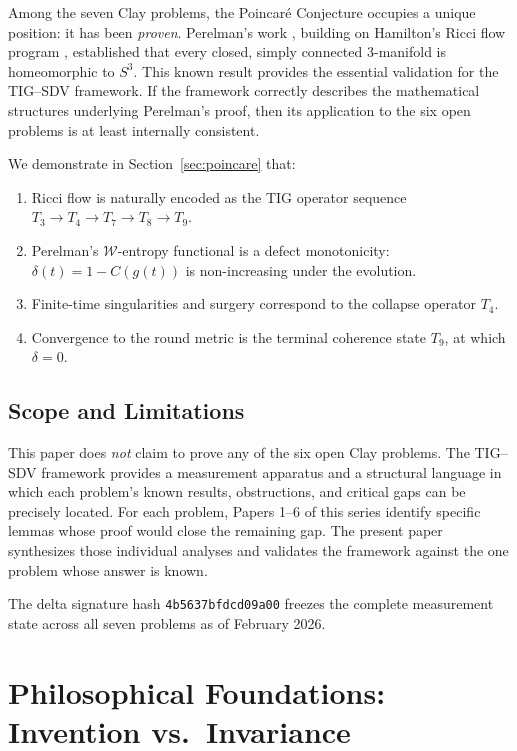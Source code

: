 \documentclass[11pt]{article}
\begin{document}
Among the seven Clay problems, the Poincar\'e Conjecture occupies a
unique position: it has been \emph{proven}.  Perelman's work
\cite{Per1,Per2,Per3}, building on Hamilton's Ricci flow program
\cite{Ham82,Ham86}, established that every closed, simply connected
3-manifold is homeomorphic to $S^3$.  This known result provides the
essential validation for the TIG--SDV framework.  If the framework
correctly describes the mathematical structures underlying Perelman's
proof, then its application to the six open problems is at least
internally consistent.

We demonstrate in Section~\ref{sec:poincare} that:
\begin{enumerate}
\item Ricci flow is naturally encoded as the TIG operator sequence
$T_3 \to T_4 \to T_7 \to T_8 \to T_9$.
\item Perelman's $\mathcal{W}$-entropy functional is a defect
monotonicity: $\delta(t) = 1 - C(g(t))$ is non-increasing under
the evolution.
\item Finite-time singularities and surgery correspond to the collapse
operator $T_4$.
\item Convergence to the round metric is the terminal coherence
state $T_9$, at which $\delta = 0$.
\end{enumerate}

\subsection{Scope and Limitations}

This paper does \emph{not} claim to prove any of the six open Clay
problems.  The TIG--SDV framework provides a measurement apparatus and
a structural language in which each problem's known results, obstructions,
and critical gaps can be precisely located.  For each problem,
Papers 1--6 of this series identify specific lemmas whose proof would
close the remaining gap.  The present paper synthesizes those individual
analyses and validates the framework against the one problem whose
answer is known.

The delta signature hash \texttt{4b5637bfdcd09a00} freezes the complete
measurement state across all seven problems as of February 2026.

\section{Philosophical Foundations: Invention vs.\ Invariance}
\label{sec:foundations}
\end{document}

